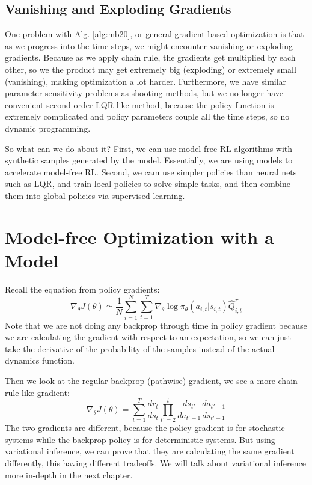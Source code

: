 \subsection{Vanishing and Exploding Gradients}
One problem with Alg. \ref{alg:mb20}, or general gradient-based optimization is that as we progress into the time steps, we might encounter vanishing or exploding gradients. Because as we apply chain rule, the gradients get multiplied by each other, so we the product may get extremely big (exploding) or extremely small (vanishing), making optimization a lot harder. Furthermore, we have similar parameter sensitivity problems as shooting methods, but we no longer have convenient second order LQR-like method, because the policy function is extremely complicated and policy parameters couple all the time steps, so no dynamic programming. %

So what can we do about it? First, we can use model-free RL algorithms with synthetic samples generated by the model. Essentially, we are using models to accelerate model-free RL. Second, we cam use simpler policies than neural nets such as LQR, and train local policies to solve simple tasks, and then combine them into global policies via supervised learning. 

\section{Model-free Optimization with a Model}
Recall the equation from policy gradients:
\[
\nabla_\theta J(\theta) \simeq \frac{1}{N}\sum_{i=1}^N\sum_{t=1}^T\nabla_\theta \log\pi_\theta(a_{i,t}|s_{i,t})\hat{Q}^\pi_{i,t}
\]
Note that we are not doing any backprop through time in policy gradient because we are calculating the gradient with respect to an expectation, so we can just take the derivative of the probability of the samples instead of the actual dynamics function. 

Then we look at the regular backprop (pathwise) gradient, we see a more chain rule-like gradient:
\[
\nabla_\theta J(\theta) = \sum_{t=1}^T\frac{dr_t}{ds_t}\prod_{t'=2}^t\frac{d{s_{t'}}}{da_{t'-1}}\frac{da_{t'-1}}{ds_{t'-1}}
\]
The two gradients are different, because the policy gradient is for stochastic systems while the backprop policy is for deterministic systems. But using variational inference, we can prove that they are calculating the same gradient differently, this having different tradeoffs. We will talk about variational inference more in-depth in the next chapter. 


